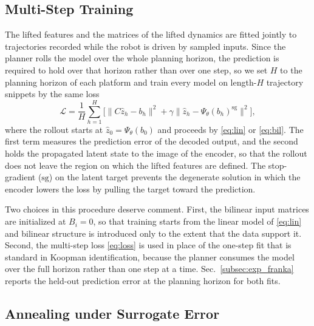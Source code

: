\documentclass[letterpaper,10pt,conference]{ieeeconf}
\begin{document}
\subsection{Multi-Step Training}\label{subsec:training}

The lifted features and the matrices of the lifted dynamics are fitted jointly to trajectories recorded while the robot is driven by sampled inputs.
Since the planner rolls the model over the whole planning horizon, the prediction is required to hold over that horizon rather than over one step, so we set $H$ to the planning horizon of each platform and train every model on length-$H$ trajectory snippets by the same loss
\begin{equation}
\mathcal{L} = \frac{1}{H} \sum_{h=1}^{H}
\Big[ \big\| C \hat{z}_h - b_h \big\|^{2}
+ \gamma \big\| \hat{z}_h - \Psi_\theta(b_h)^{\mathrm{sg}} \big\|^{2}
\Big],
\label{eq:loss}
\end{equation}
where the rollout starts at $\hat z_0 = \Psi_\theta(b_0)$ and proceeds by \eqref{eq:lin} or \eqref{eq:bil}.
The first term measures the prediction error of the decoded output, and the second holds the propagated latent state to the image of the encoder, so that the rollout does not leave the region on which the lifted features are defined.
The stop-gradient ($\mathrm{sg}$) on the latent target prevents the degenerate solution in which the encoder lowers the loss by pulling the target toward the prediction.

Two choices in this procedure deserve comment.
First, the bilinear input matrices are initialized at $B_i = 0$, so that training starts from the linear model of \eqref{eq:lin} and bilinear structure is introduced only to the extent that the data support it.
Second, the multi-step loss \eqref{eq:loss} is used in place of the one-step fit that is standard in Koopman identification, because the planner consumes the model over the full horizon rather than one step at a time.
Sec.~\ref{subsec:exp_franka} reports the held-out prediction error at the planning horizon for both fits.

\subsection{Annealing under Surrogate Error}\label{subsec:anneal_theory}
\end{document}
